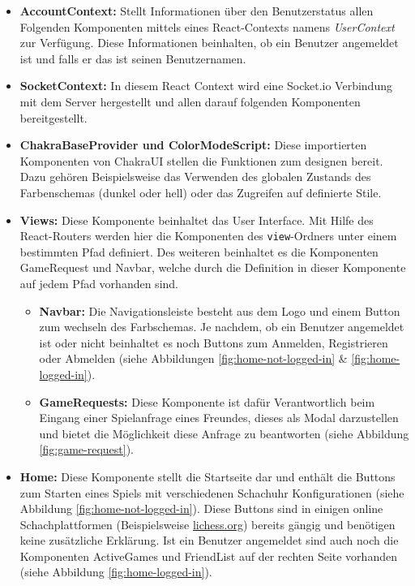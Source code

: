 \begin{itemize}
\item \textbf{AccountContext:} Stellt Informationen über den Benutzerstatus allen Folgenden Komponenten mittels eines React-Contexts namens \textit{UserContext} zur Verfügung. Diese Informationen beinhalten, ob ein Benutzer angemeldet ist und falls er das ist seinen Benutzernamen.
\item \textbf{SocketContext:} In diesem React Context wird eine Socket.io Verbindung mit dem Server hergestellt und allen darauf folgenden Komponenten bereitgestellt.
\item \textbf{ChakraBaseProvider und ColorModeScript:} Diese importierten Komponenten von ChakraUI stellen die Funktionen zum designen bereit. Dazu gehören Beispielsweise das Verwenden des globalen Zustands des Farbenschemas (dunkel oder hell) oder das Zugreifen auf definierte Stile.
\item \textbf{Views:} Diese Komponente beinhaltet das User Interface. Mit Hilfe des React-Routers werden hier die Komponenten des \verb|view|-Ordners unter einem bestimmten Pfad definiert. Des weiteren beinhaltet es die Komponenten GameRequest und Navbar, welche durch die Definition in dieser Komponente auf jedem Pfad vorhanden sind.
\begin{itemize}
\item \textbf{Navbar:} Die Navigationsleiste besteht aus dem Logo und einem Button zum wechseln des Farbschemas. Je nachdem, ob ein Benutzer angemeldet ist oder nicht beinhaltet es noch Buttons zum Anmelden, Registrieren oder Abmelden (siehe Abbildungen \ref{fig:home-not-logged-in} \& \ref{fig:home-logged-in}).
\item \textbf{GameRequests:} Diese Komponente ist dafür Verantwortlich beim Eingang einer Spielanfrage eines Freundes, dieses als Modal darzustellen und bietet die Möglichkeit diese Anfrage zu beantworten (siehe Abbildung \ref{fig:game-request}).
\end{itemize}
\item \textbf{Home:} Diese Komponente stellt die Startseite dar und enthält die Buttons zum Starten eines Spiels mit verschiedenen Schachuhr Konfigurationen (siehe Abbildung \ref{fig:home-not-logged-in}). Diese Buttons sind in einigen online Schachplattformen (Beispielsweise \url{lichess.org}) bereits gängig und benötigen keine zusätzliche Erklärung. Ist ein Benutzer angemeldet sind auch noch die Komponenten ActiveGames und FriendList auf der rechten Seite vorhanden (siehe Abbildung \ref{fig:home-logged-in}).
\begin{itemize}

\end{itemize}
\end{itemize}
